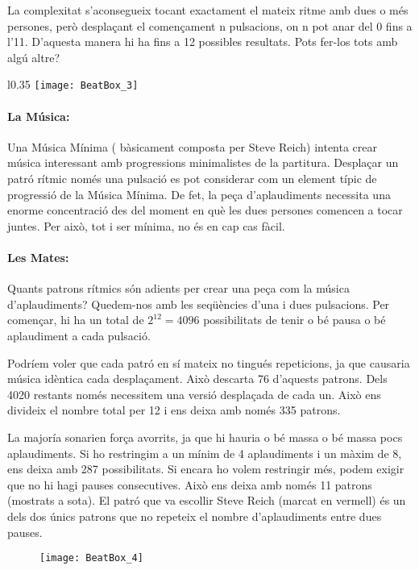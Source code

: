 La complexitat s'aconsegueix tocant exactament el mateix ritme amb dues o més persones, però desplaçant el començament n pulsacions, on n pot anar del 0 fins a l'11. D'aquesta manera hi ha fins a 12 possibles resultats. Pots fer-los tots amb algú altre?

\begin{wrapfigure}{l}{0.35\textwidth}
\centering
\texttt{[image: BeatBox\_3]}
\end{wrapfigure}

\paragraph{La Música:}
Una Música Mínima ( bàsicament composta per Steve Reich) intenta crear música interessant amb progressions minimalistes de la partitura. Desplaçar un patró rítmic només una pulsació es pot considerar com un element típic de progressió de la Música Mínima. De fet, la peça d'aplaudiments necessita una enorme concentració des del moment en què les dues persones comencen a tocar juntes. Per això, tot i ser mínima, no és en cap cas fàcil.

\paragraph{Les Mates:}
Quants patrons rítmics són adients per crear una peça com la música d'aplaudiments? Quedem-nos amb les seqüències d'una i dues pulsacions. Per començar, hi ha un total de $2^{12} = 4096$ possibilitats de tenir o bé pausa o bé aplaudiment a cada pulsació.

Podríem voler que cada patró en sí mateix no tingués repeticions, ja que causaria música idèntica cada desplaçament. Això descarta 76 d'aquests patrons. Dels 4020 restants només necessitem una versió desplaçada de cada un. Això ens divideix el nombre total per 12 i ens deixa amb només 335 patrons.

La majoría sonarien força avorrits, ja que hi hauria o bé massa o bé massa pocs aplaudiments. Si ho restringim a un mínim de 4 aplaudiments i un màxim de 8, ens deixa amb 287 possibilitats. Si encara ho volem restringir més, podem exigir que no hi hagi pauses consecutives. Això ens deixa amb només 11 patrons (mostrats a sota). El patró que va escollir Steve Reich (marcat en vermell) és un dels dos únics patrons que no repeteix el nombre d'aplaudiments entre dues pauses.

\begin{figure}[h]
\centering
\texttt{[image: BeatBox\_4]}
\end{figure}

